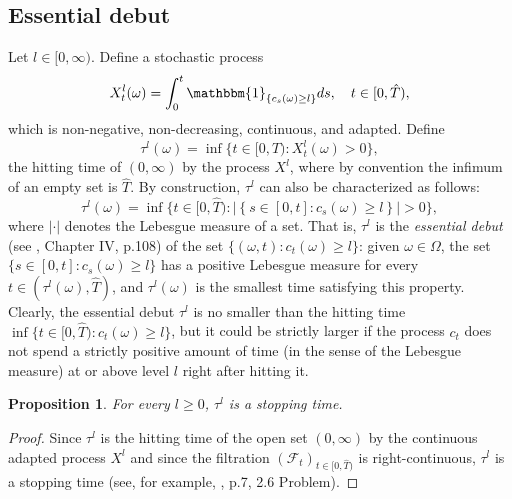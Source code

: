 \documentclass[11pt, oneside]{article}   	%
\theoremstyle{plain}
\newtheorem{prop}[thm]{Proposition}
\theoremstyle{definition}
\theoremstyle{remark}
\begin{document}


\subsection{Essential debut}\label{sec:ess-debut}

Let $l\in[0,\infty)$. Define a stochastic process
$$X_t^l(\omega)=\int_0^t\mathbbm{1}_{\{c_s(\omega)\geq l\}}ds,\quad t\in[0,\hat{T}),$$
which is non-negative, non-decreasing, continuous, and adapted. Define
$$\tau^l(\omega)=\inf\{t\in[0,\hat{T}): X_t^l(\omega)>0\},$$
the hitting time of $(0,\infty)$ by the process $X^l$, where by convention the infimum of an empty set is $\hat{T}$. By construction, $\tau^l$ can also be characterized as follows:
$$\tau^l(\omega)=\inf\{t\in[0,\hat{T}): \vert \left\{s\in[0,t]: c_s(\omega)\geq l\right\}\vert>0\},$$
where $\vert\cdot\vert$ denotes the Lebesgue measure of a set. That is, $\tau^l$ is the \textit{essential debut} (see \cite{dellacherie-meyerA}, Chapter IV, p.108) of the set $\{(\omega,t): c_t(\omega)\geq l\}$: given $\omega\in\Omega$, the set $\{s\in[0,t]: c_s(\omega)\geq l\}$ has a positive Lebesgue measure for every $t\in(\tau^l(\omega),\hat{T})$, and $\tau^l(\omega)$ is the smallest time satisfying this property. Clearly, the essential debut $\tau^l$ is no smaller than the hitting time $\inf\{t\in[0,\hat{T}):c_t(\omega)\geq l\}$, but it could be strictly larger if the process $c_t$ does not spend a strictly positive amount of time (in the sense of the Lebesgue measure) at or above level $l$ right after hitting it.
\begin{prop}\label{prop:stopping-time}
For every $l\geq 0$, $\tau^l$ is a stopping time.
\end{prop}
\begin{proof}
Since $\tau^l$ is the hitting time of the open set $(0,\infty)$ by the continuous adapted process $X^l$ and since the filtration $\left(\mathcal{F}_t\right)_{t\in[0,\hat{T})}$ is right-continuous, $\tau^l$ is a stopping time (see, for example, \cite{karatzas-shreve-book}, p.7, 2.6 Problem).
\end{proof}

\end{document}
